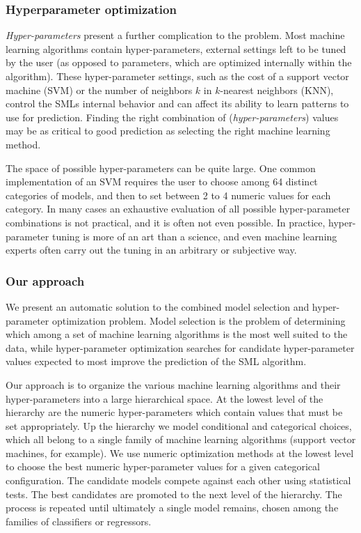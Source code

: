 \subsubsection{Hyperparameter optimization}

\emph{Hyper-parameters} present a further complication to the problem. Most machine learning
algorithms contain hyper-parameters, external settings left to be tuned by the user (as opposed to
parameters, which are optimized internally within the algorithm). These hyper-parameter settings,
such as the cost of a support vector machine (SVM) or the number of neighbors $k$ in $k$-nearest
neighbors (KNN), control the SMLs internal behavior and can affect its ability to  learn patterns to
use for prediction. Finding the right combination of (\emph{hyper-parameters}) values may be as
critical to good prediction as selecting the right machine learning method.

The space of possible hyper-parameters can be quite large. One common implementation of an SVM
requires the user to choose among 64 distinct categories of models, and then to set between 2 to 4
numeric values for each category. In many cases an exhaustive evaluation of all possible
hyper-parameter combinations is not practical, and it is often not even possible. In practice,
hyper-parameter tuning is more of an art than a science, and even machine learning experts often
carry out the tuning in an arbitrary or subjective way.


\subsubsection{Our approach}

We present an automatic solution to the combined model selection and hyper-parameter optimization problem. Model selection is the problem of determining which among a set of machine learning algorithms is the most well suited to the data, while hyper-parameter optimization searches for candidate hyper-parameter values expected to most improve the prediction of the SML algorithm.

Our approach is to organize the various machine learning algorithms and their hyper-parameters into a large hierarchical space. At the lowest level of the hierarchy are the numeric hyper-parameters which contain values that must be set appropriately. Up the hierarchy we model conditional and categorical choices, which all belong to a single family of machine learning algorithms (support vector machines, for example). We use numeric optimization methods at the lowest level to choose the best numeric hyper-parameter values for a given categorical configuration. The candidate models compete against each other using statistical tests. The best candidates are promoted to the next level of the hierarchy. The process is repeated until ultimately a single model remains, chosen among the families of classifiers or regressors. 

